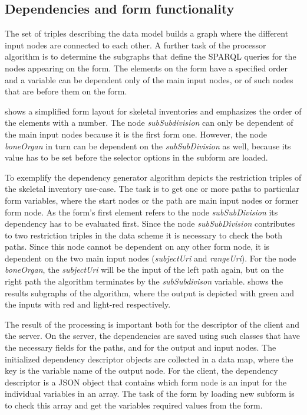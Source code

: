 \subsection{Dependencies and form functionality}  \label{512}

The set of triples describing the data model builds a graph where the different input nodes are connected to each other. A further task of the processor algorithm is to determine the subgraphs that define the SPARQL queries for the nodes appearing on the form. The elements on the form have a specified order and a variable can be dependent only of the main input nodes, or of such nodes that are before them on the form.


 shows a simplified form layout for skeletal inventories and emphasizes the order of the elements with a number. The node \textit{subSubdivision} can only be dependent of the main input nodes because it is the first form one. However, the node \textit{boneOrgan} in turn can be dependent on the \textit{subSubDivision} as well, because its value has to be set before the selector options in the subform are loaded.


To exemplify the dependency generator algorithm  depicts the restriction triples of the skeletal inventory use-case. The task is to get one or more paths to particular form variables, where the start nodes or the path are main input nodes or former form node. As the form's first element refers to the node \textit{subSubDivision} its dependency has to be evaluated first. Since the node \textit{subSubDivision} contributes to two restriction triples in the data scheme it is necessary to check the both paths. Since this node cannot be dependent on any other form node, it is dependent on the two main input nodes (\textit{subjectUri} and \textit{rangeUri}). For the node \textit{boneOrgan}, the \textit{subjectUri} will be the input of the left path again, but on the right path the algorithm terminates by the \textit{subSubdivison} variable.  shows the results subgraphs of the algorithm, where the output is depicted with green and the inputs with red and light-red respectively.


The result of the processing is important both for the descriptor of the client and the server. On the server, the dependencies are saved using such classes that have the necessary fields for the paths, and for the output and input nodes. The initialized dependency descriptor objects are collected in a data map, where the key is the variable name of the output node. For the client, the dependency descriptor is a JSON object that contains which form node is an input for the individual variables in an array. The task of the form by loading new subform is to check this array and get the variables required values from the form.

